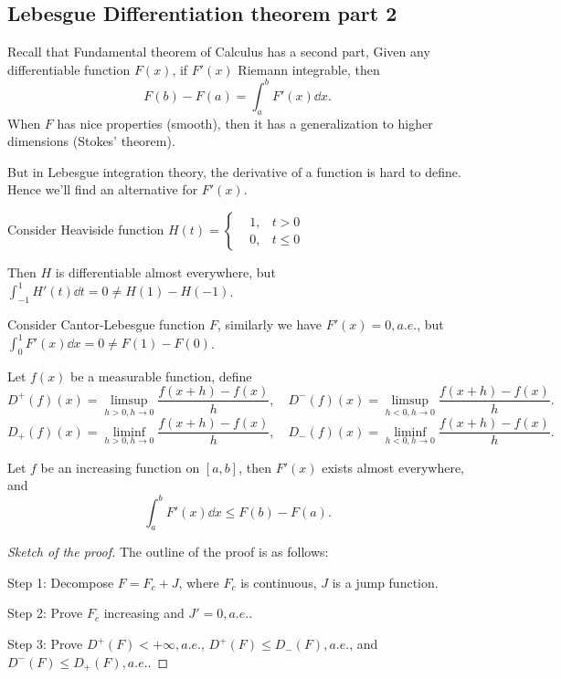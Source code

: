 \subsection{Lebesgue Differentiation theorem part 2}
\label{sub:Lebesgue Differentiation theorem part 2}

Recall that Fundamental theorem of Calculus has a second part,
Given any differentiable function $F(x)$, if $F'(x)$ Riemann integrable,
then
 \[
F(b)-F(a) = \int_a^b F'(x)\dd x.
\]
When $F$ has nice properties (smooth), then it has a generalization to
higher dimensions (Stokes' theorem).

But in Lebesgue integration theory, the derivative of a function
is hard to define. Hence we'll find an alternative for $F'(x)$.

\begin{example}
	Consider Heaviside function $H(t) = \left\{\begin{aligned}
			&1, &t>0\\ &0, &t\le 0
    \end{aligned} \right.$

	Then $H$ is differentiable almost everywhere,
	but $\int_{-1}^1 H'(t)\dd t = 0 \ne H(1)-H(-1)$.
\end{example}
\begin{example}
    Consider Cantor-Lebesgue function $F$,
	similarly we have $F'(x)=0, a.e.$,
	but  $\int_0^1 F'(x)\dd x = 0\ne F(1)-F(0)$.
\end{example}

\begin{definition}
	Let $f(x)$ be a measurable function, define
	\[
	D^+(f)(x) = \limsup_{h>0, h\to 0}\frac{f(x+h)-f(x)}{h},\quad
	D^-(f)(x) = \limsup_{h<0, h\to 0}\frac{f(x+h)-f(x)}{h}.
	\]
	\[
	D_+(f)(x) = \liminf_{h>0, h\to 0}\frac{f(x+h)-f(x)}{h},\quad
	D_-(f)(x) = \liminf_{h<0, h\to 0}\frac{f(x+h)-f(x)}{h}.
	\]
\end{definition}

\begin{theorem}
	\label{LebesgueIncreasing}
	Let $f$ be an increasing function on $[a,b]$,
	then $F'(x)$ exists almost everywhere, and
	\[
	\int_{a}^{b} F'(x)\dd x \le F(b) - F(a).
	\]
\end{theorem}
\begin{proof}[Sketch of the proof]
	The outline of the proof is as follows:

    Step 1: Decompose $F = F_c + J$, where $F_c$ is continuous, $J$ is a jump function.

	Step 2: Prove $F_c$ increasing and  $J'=0, a.e.$.

	Step 3: Prove $D^+(F)<+\infty, a.e.$, $D^+(F)\le D_-(F), a.e.$,
	and $D^-(F)\le D_+(F),a.e.$.
\end{proof}

